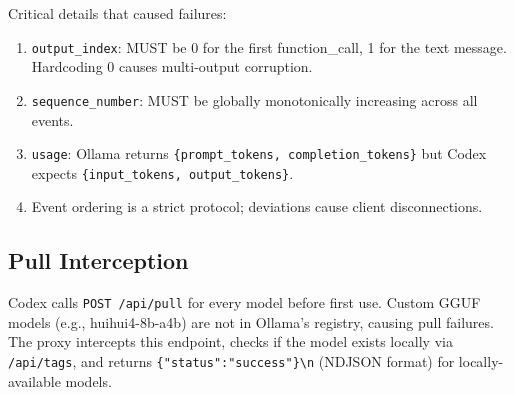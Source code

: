 \documentclass[11pt,a4paper]{article}
\begin{document}
\begin{figure}[H]
\centering
{}
\end{figure}

Critical details that caused failures:

\begin{enumerate}[nosep]
  \item \texttt{output\_index}: MUST be 0 for the first function\_call, 1
        for the text message. Hardcoding 0 causes multi-output corruption.
  \item \texttt{sequence\_number}: MUST be globally monotonically increasing
        across all events.
  \item \texttt{usage}: Ollama returns \texttt{\{prompt\_tokens,
        completion\_tokens\}} but Codex expects \texttt{\{input\_tokens,
        output\_tokens\}}.
  \item Event ordering is a strict protocol; deviations cause client
        disconnections.
\end{enumerate}

\subsection{Pull Interception}

Codex calls \texttt{POST /api/pull} for every model before first use.
Custom GGUF models (e.g., huihui4-8b-a4b) are not in Ollama's registry,
causing pull failures. The proxy intercepts this endpoint, checks if the
model exists locally via \texttt{/api/tags}, and returns
\texttt{\{"status":"success"\}\textbackslash n} (NDJSON format) for
locally-available models.
\end{document}
